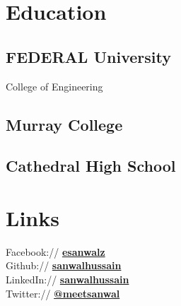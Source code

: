 \documentclass[]{deedy-resume-openfont}
\begin{document}
%
%
\lastupdated

%
%

%
%

\begin{minipage}[t]{0.33\textwidth} 


\section{Education} 

\subsection{FEDERAL University}
College of Engineering \\
\sectionsep

\subsection{Murray College}
\sectionsep

\subsection{Cathedral High School}
\sectionsep


\section{Links} 
Facebook:// \href{https://facebook.com/esanwalz}{\bf esanwalz} \\
Github:// \href{https://github.com/sanwalhussain}{\bf sanwalhussain} \\
LinkedIn://  \href{https://www.linkedin.com/in/sanwalhussain}{\bf sanwalhussain} \\
Twitter://  \href{https://twitter.com/meetsanwal}{\bf @meetsanwal} \\


\end{minipage}
\end{document}
